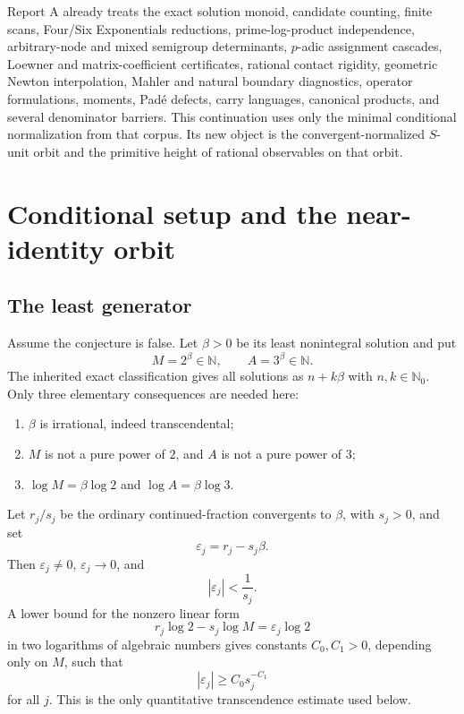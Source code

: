 \documentclass[11pt,oneside]{article}
\theoremstyle{definition}
\theoremstyle{remark}
\newcommand{\N}{\mathbb N}
\newcommand{\Nzero}{\mathbb N_0}
\newcommand{\eps}{\varepsilon}
\begin{document}
Report A already treats the exact solution monoid, candidate counting, finite scans,
Four/Six Exponentials reductions, prime-log-product independence, arbitrary-node and mixed
semigroup determinants, $p$-adic assignment cascades, Loewner and matrix-coefficient
certificates, rational contact rigidity, geometric Newton interpolation, Mahler and natural
boundary diagnostics, operator formulations, moments, Pad\'e defects, carry languages,
canonical products, and several denominator barriers.  This continuation uses only the
minimal conditional normalization from that corpus.  Its new object is the convergent-normalized
$S$-unit orbit and the primitive height of rational observables on that orbit.

\section{Conditional setup and the near-identity orbit}
\label{sec:setup}

\subsection{The least generator}

Assume the conjecture is false.  Let $\beta>0$ be its least nonintegral solution and put
\begin{equation}
 M=2^\beta\in\N,\qquad A=3^\beta\in\N.
 \label{eq:MA}
\end{equation}
The inherited exact classification gives all solutions as $n+k\beta$ with
$n,k\in\Nzero$.  Only three elementary consequences are needed here:

\begin{enumerate}
\item $\beta$ is irrational, indeed transcendental;
\item $M$ is not a pure power of $2$, and $A$ is not a pure power of $3$;
\item $\log M=\beta\log2$ and $\log A=\beta\log3$.
\end{enumerate}

Let $r_j/s_j$ be the ordinary continued-fraction convergents to $\beta$, with $s_j>0$, and
set
\begin{equation}
 \eps_j=r_j-s_j\beta.
 \label{eq:epsilon}
\end{equation}
Then $\eps_j\ne0$, $\eps_j\to0$, and
\begin{equation}
 |\eps_j|<\frac1{s_j}.
 \label{eq:cf-upper}
\end{equation}
A lower bound for the nonzero linear form
\[
 r_j\log2-s_j\log M=\eps_j\log2
\]
in two logarithms of algebraic numbers gives constants $C_0,C_1>0$, depending only on $M$,
such that
\begin{equation}
 |\eps_j|\ge C_0s_j^{-C_1}
 \label{eq:baker-lower}
\end{equation}
for all $j$.  This is the only quantitative transcendence estimate used below.
\end{document}
